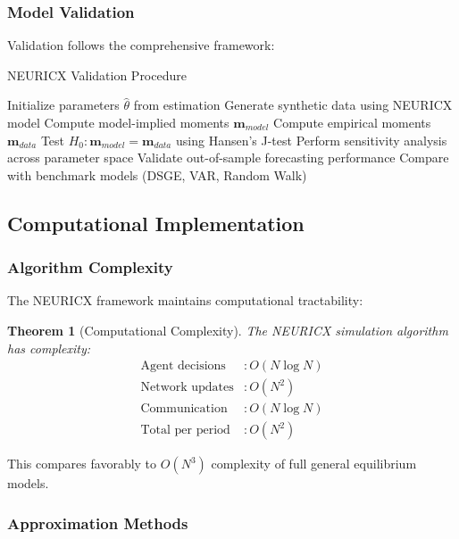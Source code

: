 \documentclass[12pt,a4paper]{article}
\newtheorem{theorem}{Theorem}[section]
\begin{document}
\subsubsection{Model Validation}

Validation follows the comprehensive framework:

\begin{algorithm}
\caption{NEURICX Validation Procedure}
\begin{algorithmic}[1]
\STATE Initialize parameters $\hat{\theta}$ from estimation
\STATE Generate synthetic data using NEURICX model
\STATE Compute model-implied moments $\mathbf{m}_{model}$
\STATE Compute empirical moments $\mathbf{m}_{data}$
\STATE Test $H_0: \mathbf{m}_{model} = \mathbf{m}_{data}$ using Hansen's J-test
\STATE Perform sensitivity analysis across parameter space
\STATE Validate out-of-sample forecasting performance
\STATE Compare with benchmark models (DSGE, VAR, Random Walk)
\end{algorithmic}
\end{algorithm}

\subsection{Computational Implementation}

\subsubsection{Algorithm Complexity}

The NEURICX framework maintains computational tractability:

\begin{theorem}[Computational Complexity]
The NEURICX simulation algorithm has complexity:
\begin{align}
\text{Agent decisions} &: O(N \log N) \\
\text{Network updates} &: O(N^2) \\
\text{Communication} &: O(N \log N) \\
\text{Total per period} &: O(N^2)
\end{align}
\end{theorem}

This compares favorably to $O(N^3)$ complexity of full general equilibrium models.

\subsubsection{Approximation Methods}
\end{document}
